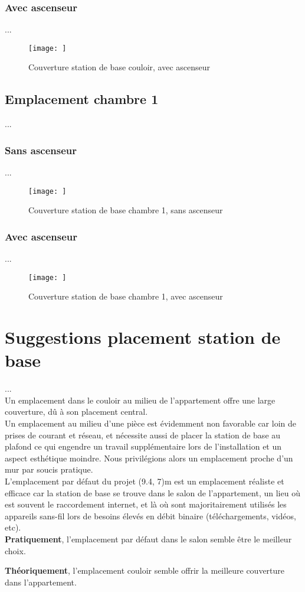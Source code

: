 \subsubsection{Avec ascenseur}
...
\begin{figure}[H]
    \centering
    \texttt{[image: ]}
    \caption{Couverture station de base couloir, avec ascenseur}
    \label{fig:simu-emplacement-couloir-avecasc}
\end{figure}


\subsection{Emplacement chambre 1}
...
\subsubsection{Sans ascenseur}
...
\begin{figure}[H]
    \centering
    \texttt{[image: ]}
    \caption{Couverture station de base chambre 1, sans ascenseur}
    \label{fig:simu-emplacement-chambre1-sansasc}
\end{figure}
\subsubsection{Avec ascenseur}
...
\begin{figure}[H]
    \centering
    \texttt{[image: ]}
    \caption{Couverture station de base chambre 1, avec ascenseur}
    \label{fig:simu-emplacement-chambre1-avecasc}
\end{figure}


\section{Suggestions placement station de base}

...\\

Un emplacement dans le couloir au milieu de l'appartement offre une large couverture, dû à son placement central.\\

Un emplacement au milieu d'une pièce est évidemment non favorable car loin de prises de courant et réseau, et nécessite aussi de placer la station de base au plafond ce qui engendre un travail supplémentaire lors de l'installation et un aspect esthétique moindre. Nous privilégions alors un emplacement proche d'un mur par soucis pratique.\\

L'emplacement par défaut du projet (9.4, 7)m est un emplacement réaliste et efficace car la station de base se trouve dans le salon de l'appartement, un lieu où est souvent le raccordement internet, et là où sont majoritairement utilisés les appareils sans-fil lors de besoins élevés en débit binaire (téléchargements, vidéos, etc).\\

\textbf{Pratiquement}, l'emplacement par défaut dans le salon semble être le meilleur choix.

\textbf{Théoriquement}, l'emplacement couloir semble offrir la meilleure couverture dans l'appartement.\\
